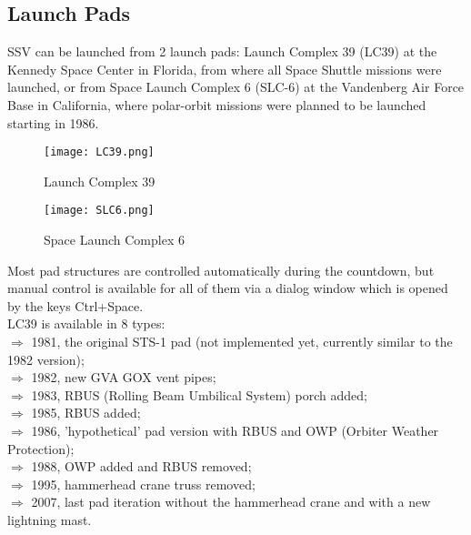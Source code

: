 \documentclass[Space_Shuttle_Vessel_Manual.tex]{subfiles}
\begin{document}
\begin{multicols*}{2}
\subsection{Launch Pads}
SSV can be launched from 2 launch pads: Launch Complex 39 (LC39) at the Kennedy Space Center in Florida, from where all Space Shuttle missions were launched, or from Space Launch Complex 6 (SLC-6) at the Vandenberg Air Force Base in California, where polar-orbit missions were planned to be launched starting in 1986.
\begin{figure}[H]
  \texttt{[image: LC39.png]}
  \caption{Launch Complex 39}
  \label{fig:LC39}
\end{figure}
\begin{figure}[H]
  \texttt{[image: SLC6.png]}
  \caption{Space Launch Complex 6}
  \label{fig:SLC6}
\end{figure}
\noindent
Most pad structures are controlled automatically during the countdown, but manual control is available for all of them via a dialog window which is opened by the keys Ctrl+Space.\\
\noindent
LC39 is available in 8 types$\colon$\\
$\Rightarrow$ 1981, the original STS-1 pad (not implemented yet, currently similar to the 1982 version);\\
$\Rightarrow$ 1982, new GVA GOX vent pipes;\\
$\Rightarrow$ 1983, RBUS (Rolling Beam Umbilical System) porch added;\\
$\Rightarrow$ 1985, RBUS added;\\
$\Rightarrow$ 1986, 'hypothetical' pad version with RBUS and OWP (Orbiter Weather Protection);\\
$\Rightarrow$ 1988, OWP added and RBUS removed;\\
$\Rightarrow$ 1995, hammerhead crane truss removed;\\
$\Rightarrow$ 2007, last pad iteration without the hammerhead crane and with a new lightning mast.\\
\end{multicols*}
\end{document}
